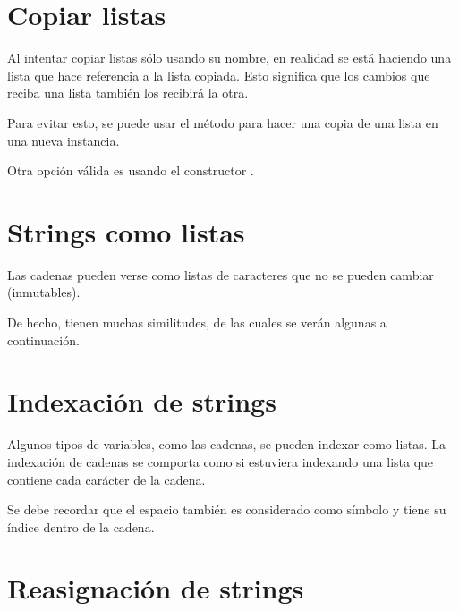 \section{Copiar listas}

Al intentar copiar listas sólo usando su nombre, en realidad se está haciendo una lista que hace referencia a la lista copiada. Esto significa que los cambios que reciba una lista también los recibirá la otra.


Para evitar esto, se puede usar el método  para hacer una copia de una lista en una nueva instancia.


Otra opción válida es usando el constructor .


\section{Strings como listas}

Las cadenas pueden verse como listas de caracteres que no se pueden cambiar (inmutables).


De hecho, tienen muchas similitudes, de las cuales se verán algunas a continuación.

\section{Indexación de strings}

Algunos tipos de variables, como las cadenas, se pueden indexar como listas. La indexación de cadenas se comporta como si estuviera indexando una lista que contiene cada carácter de la cadena.


Se debe recordar que el espacio \ttt{\qq  \qq} también es considerado como símbolo y tiene su índice dentro de la cadena.\smallskip

\section{Reasignación de strings}

